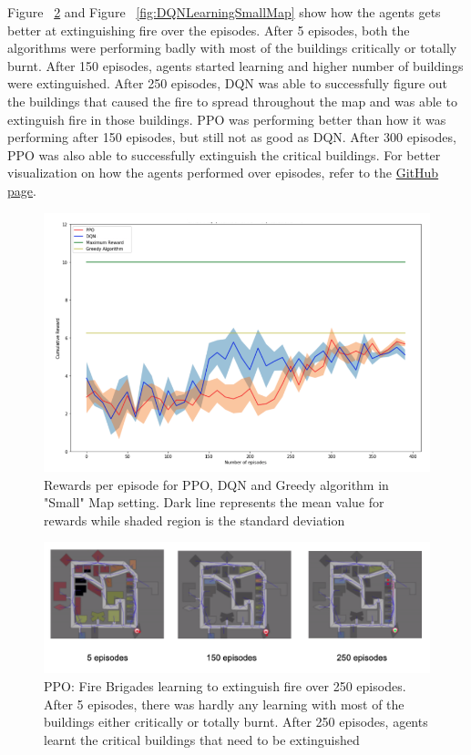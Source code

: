 \documentclass[12pt]{report}
\begin{document}
Figure ~\ref{fig:PPOLearningSmallMap} and Figure ~\ref{fig:DQNLearningSmallMap} show how the agents gets better at extinguishing fire over the episodes. After 5 episodes, both the algorithms were performing badly with most of the buildings critically or totally burnt. After 150 episodes, agents started learning and higher number of buildings were extinguished. After 250 episodes, DQN was able to successfully figure out the buildings that caused the fire to spread throughout the map and was able to extinguish fire in those buildings. PPO was performing better than how it was performing after 150 episodes, but still not as good as DQN. After 300 episodes, PPO was also able to successfully extinguish the critical buildings. For better visualization on how the agents performed over episodes, refer to the \href{https://github.com/animeshgoyal9/RoboCup_Rescue_Simulator_Gym_Integration} {GitHub page}. 

\begin{figure}[!h]
    \centering
    \includegraphics[width=12cm]{29.png}
    \caption{Rewards per episode for PPO, DQN and Greedy algorithm in "Small" Map setting. Dark line represents the mean value for rewards while shaded region is the standard deviation}
    \label{fig:SmallMapResults}
\end{figure}

\begin{figure}[!h]
    \centering
    \includegraphics[width=17cm]{PPO.png}
    \caption{PPO: Fire Brigades learning to extinguish fire over 250 episodes. After 5 episodes, there was hardly any learning with most of the buildings either critically or totally burnt. After 250 episodes, agents learnt the critical buildings that need to be extinguished}
    \label{fig:PPOLearningSmallMap}
\end{figure}
\end{document}
